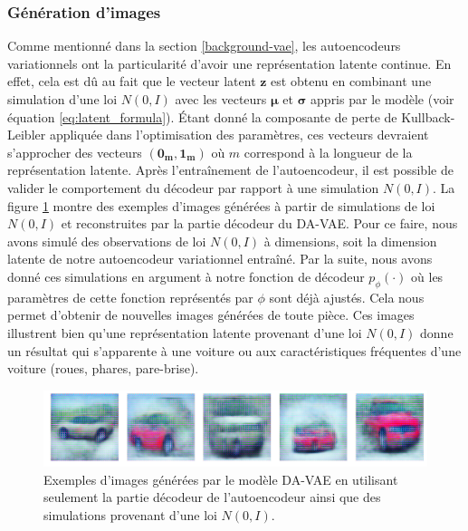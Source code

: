 \subsubsection{Génération d'images}

Comme mentionné dans la section \ref{background-vae}, les autoencodeurs variationnels ont la particularité d'avoir une représentation latente continue. En effet, cela est dû au fait que le vecteur latent $\boldsymbol{z}$ est obtenu en combinant une simulation d'une loi $N(0,I)$ avec les vecteurs $\boldsymbol{\mu}$ et $\boldsymbol{\sigma}$ appris par le modèle (voir équation \ref{eq:latent_formula}). Étant donné la composante de perte de Kullback-Leibler appliquée dans l'optimisation des paramètres, ces \DIFdelbegin {}\DIFdelend \DIFaddbegin {}\DIFaddend vecteurs devraient s'approcher des vecteurs $(\boldsymbol{0_{m}}, \boldsymbol{1_{m}})$ où $m$ correspond à la longueur de la représentation latente. Après l'entraînement de l'autoencodeur, il est possible de valider le comportement du décodeur par rapport à une simulation $N(0,I)$. La figure \ref{fig:generated_cars} montre des exemples d'images générées à partir de simulations de loi $N(0,I)$ et reconstruites par la partie décodeur du DA-VAE. Pour ce faire, nous avons simulé des observations de loi $N(0,I)$ à \DIFdelbegin {}\DIFdelend \DIFaddbegin {}\DIFaddend dimensions, soit la dimension latente de notre autoencodeur variationnel entraîné. Par la suite, nous avons donné ces simulations en argument à notre fonction de décodeur $p_{\phi}(\cdot)$ où les paramètres de cette fonction représentés par $\phi$ \DIFdelbegin \DIFdel{, }\DIFdelend sont déjà ajustés. Cela nous permet d'obtenir de nouvelles images générées de toute pièce. Ces images illustrent bien qu'une représentation latente provenant d'une loi $N(0,I)$ donne un résultat qui s'apparente à une voiture ou aux caractéristiques fréquentes d'une voiture (roues, phares, pare-brise).

\begin{figure}[htb]
	\centering
	\includegraphics[width=\textwidth]{images/generated_cars}
	\caption{Exemples d'images générées par le modèle DA-VAE en utilisant seulement la partie décodeur de l'autoencodeur ainsi que des simulations provenant d'une loi $N(0,I)$.}
	\label{fig:generated_cars}
\end{figure}

